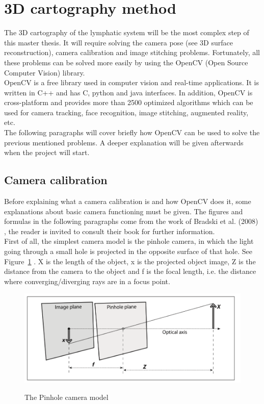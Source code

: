 \section{3D cartography method}
\label{sec:3D cartography method}

The 3D cartography of the lymphatic system will be the most complex step of this master thesis. It will require solving the camera pose (see 3D surface reconstruction), camera calibration and image stitching problems. Fortunately, all these problems can be solved more easily by using the OpenCV (Open Source Computer Vision) library. \\

OpenCV is a free library used in computer vision and real-time applications. It is written in C++ and has C, python and java interfaces. In addition, OpenCV is cross-platform and provides more than 2500 optimized algorithms \cite{_opencv_????} which can be used for camera tracking, face recognition, image stitching, augmented reality, etc.  \\

The following paragraphs will cover briefly how OpenCV can be used to solve the previous mentioned problems. A deeper explanation will be given afterwards when the project will start. \\

\subsection{Camera calibration}

Before explaining what a camera calibration is and how OpenCV does it, some explanations about basic camera functioning must be given. The figures and formulas in the following paragraphs come from the work of Bradski et al. (2008) \cite{bradski_learning_2008}, the reader is invited to consult their book for further information.\\

First of all, the simplest camera model is the pinhole camera, in which the light going through a small hole is projected in the opposite surface of that hole. See Figure~\ref{fig:pinhole} \cite[p. 372]{bradski_learning_2008}. X is the length of the object, x is the projected object image, Z is the distance from the camera to the object and f is the focal length, i.e. the distance where converging/diverging rays are in a focus point.\\

\begin{figure}[t]
\caption{The Pinhole camera model}
\centering
    \includegraphics[width=1.0\textwidth]{images/pinhole.png}
\label{fig:pinhole}
\end{figure}

